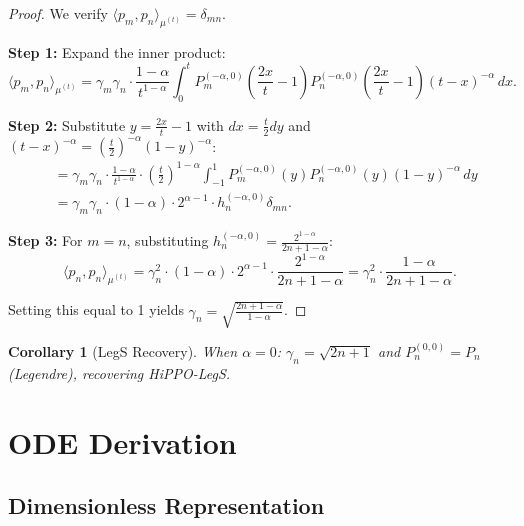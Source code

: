 \documentclass{article}
\theoremstyle{plain}
\newtheorem{corollary}[theorem]{Corollary}
\theoremstyle{definition}
\theoremstyle{remark}
\begin{document}
\begin{proof}
	We verify $\langle p_m, p_n \rangle_{\mu^{(t)}} = \delta_{mn}$.
	
	\textbf{Step 1:} Expand the inner product:
	\begin{equation}
		\langle p_m, p_n \rangle_{\mu^{(t)}} = \gamma_m \gamma_n \cdot \frac{1-\alpha}{t^{1-\alpha}} \int_0^t P_m^{(-\alpha, 0)}\left(\frac{2x}{t} - 1\right) P_n^{(-\alpha, 0)}\left(\frac{2x}{t} - 1\right) (t-x)^{-\alpha} \, dx.
	\end{equation}
	
	\textbf{Step 2:} Substitute $y = \frac{2x}{t} - 1$ with $dx = \frac{t}{2}dy$ and $(t-x)^{-\alpha} = (\frac{t}{2})^{-\alpha}(1-y)^{-\alpha}$:
	\begin{align}
		&= \gamma_m \gamma_n \cdot \frac{1-\alpha}{t^{1-\alpha}} \cdot \left(\frac{t}{2}\right)^{1-\alpha} \int_{-1}^{1} P_m^{(-\alpha, 0)}(y) P_n^{(-\alpha, 0)}(y) (1-y)^{-\alpha} \, dy \\
		&= \gamma_m \gamma_n \cdot (1-\alpha) \cdot 2^{\alpha-1} \cdot h_n^{(-\alpha, 0)} \delta_{mn}.
	\end{align}
	
	\textbf{Step 3:} For $m = n$, substituting $h_n^{(-\alpha, 0)} = \frac{2^{1-\alpha}}{2n + 1 - \alpha}$:
	\begin{equation}
		\langle p_n, p_n \rangle_{\mu^{(t)}} = \gamma_n^2 \cdot (1-\alpha) \cdot 2^{\alpha-1} \cdot \frac{2^{1-\alpha}}{2n + 1 - \alpha} = \gamma_n^2 \cdot \frac{1-\alpha}{2n + 1 - \alpha}.
	\end{equation}
	
	Setting this equal to 1 yields $\gamma_n = \sqrt{\frac{2n + 1 - \alpha}{1 - \alpha}}$.
\end{proof}

\begin{corollary}[LegS Recovery]
	When $\alpha = 0$: $\gamma_n = \sqrt{2n+1}$ and $P_n^{(0,0)} = P_n$ (Legendre), recovering HiPPO-LegS.
\end{corollary}

\section{ODE Derivation}
\label{app:ode_derivation}

\subsection{Dimensionless Representation}
\end{document}

